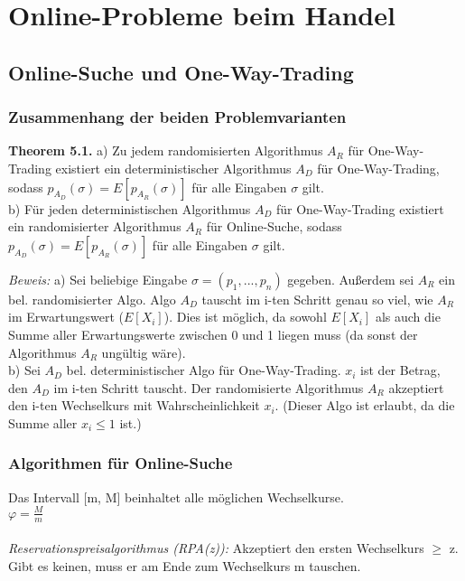 \chapter{Online-Probleme beim Handel}


\section{Online-Suche und One-Way-Trading}

\subsection{Zusammenhang der beiden Problemvarianten}

\textbf{Theorem 5.1.} a) Zu jedem randomisierten Algorithmus $A_{R}$ für One-Way-Trading existiert ein deterministischer Algorithmus $A_{D}$ für One-Way-Trading, sodass $p_{A_{D}}(\sigma) = E[p_{A_{R}}(\sigma)]$ für alle Eingaben $\sigma$ gilt. \\
b) Für jeden deterministischen Algorithmus $A_{D}$ für One-Way-Trading existiert ein randomisierter Algorithmus $A_{R}$ für Online-Suche, sodass $p_{A_{D}}(\sigma) = E[p_{A_{R}}(\sigma)]$ für alle Eingaben $\sigma$ gilt.

\textit{Beweis:} a) Sei beliebige Eingabe $\sigma = (p_{1}, ..., p_{n})$ gegeben. Außerdem sei $A_{R}$ ein bel. randomisierter Algo. Algo $A_{D}$ tauscht im i-ten Schritt genau so viel, wie $A_{R}$ im Erwartungswert ($E[X_{i}]$). Dies ist möglich, da sowohl $E[X_{i}]$ als auch die Summe aller Erwartungswerte zwischen 0 und 1 liegen muss (da sonst der Algorithmus $A_{R}$ ungültig wäre). \\
b) Sei $A_{D}$ bel. deterministischer Algo für One-Way-Trading. $x_{i}$ ist der Betrag, den $A_{D}$ im i-ten Schritt tauscht. Der randomisierte Algorithmus $A_{R}$ akzeptiert den i-ten Wechselkurs mit Wahrscheinlichkeit $x_{i}$. (Dieser Algo ist erlaubt, da die Summe aller $x_{i} \le 1$ ist.)

\subsection{Algorithmen für Online-Suche}

Das Intervall [m, M] beinhaltet alle möglichen Wechselkurse.\\
$\varphi = \tfrac{M}{m}$\\
\\
\textit{Reservationspreisalgorithmus (RPA(z)):} Akzeptiert den ersten Wechselkurs $\ge$ z. Gibt es keinen, muss er am Ende zum Wechselkurs m tauschen.  

